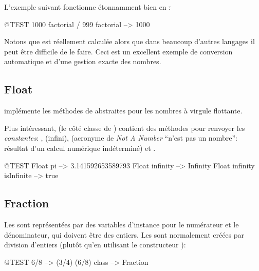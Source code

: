 \documentclass[a4paper,10pt,twoside]{book}
\begin{document}
L'exemple suivant fonctionne étonnamment bien en \st:
\begin{code}{@TEST}
1000 factorial / 999 factorial --> 1000
\end{code}
Notons que  est réellement calculée alors que dans beaucoup d'autres langages il peut être difficile de le faire. Ceci est un excellent exemple de conversion automatique et d'une gestion exacte des nombres.


\subsection{Float}

 implémente les méthodes de  abstraites pour les nombres à virgule flottante.

Plus intéressant,  (\ie le côté classe de
) contient des méthodes pour renvoyer les
\emph{constantes}: , 
(infini), 
(acronyme de \emph{Not A Number} \cad ``n'est pas un nombre'':
résultat d'un calcul numérique indéterminé)
et .

\begin{code}{@TEST}
Float pi                      --> 3.141592653589793
Float infinity               --> Infinity
Float infinity isInfinite --> true
\end{code}

\subsection{Fraction}

Les  sont représentées par des variables d'instance pour le numérateur et le dénominateur, qui doivent être des entiers. Les  sont normalement créées par division d'entiers (plutôt qu'en utilisant le constructeur ):

\begin{code}{@TEST}
6/8             --> (3/4)
(6/8) class --> Fraction
\end{code}
\end{document}
